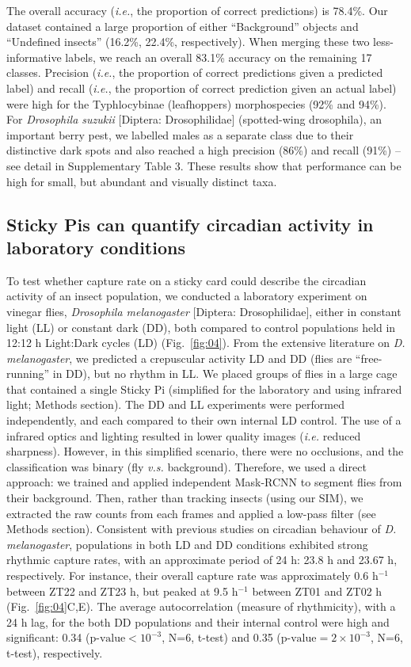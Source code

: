 \documentclass[12pt]{article}
\begin{document}
\begin{linenumbers}
		 The overall accuracy (\emph{i.e.}, the proportion of correct predictions) is 78.4\%. Our dataset contained a large proportion of either “Background” objects and “Undefined insects” (16.2\%, 22.4\%, respectively). When merging these two less-informative labels, we reach an overall 83.1\% accuracy on the remaining 17 classes. Precision (\emph{i.e.}, the proportion of correct predictions given a predicted label) and recall (\emph{i.e.}, the proportion of correct prediction given an actual label) were high for the Typhlocybinae (leafhoppers) morphospecies (92\% and 94\%). For \emph{Drosophila suzukii} [Diptera: Drosophilidae] (spotted-wing drosophila), an important berry pest, we labelled males as a separate class due to their distinctive dark spots and also reached a high precision (86\%) and recall (91\%) -- see detail in Supplementary Table 3. These results show that performance can be high for small, but abundant and visually distinct taxa.

		\subsection*{Sticky Pis can quantify circadian activity in laboratory conditions}
		To test whether capture rate on a sticky card could describe the circadian activity of an insect population, we conducted a laboratory experiment on vinegar flies, \emph{Drosophila melanogaster} [Diptera: Drosophilidae], either in constant light (LL) or constant dark (DD), both compared to control populations held in 12:12 h Light:Dark cycles (LD) (Fig.~\ref{fig:04}). From the extensive literature on \emph{D. melanogaster}, we predicted a crepuscular activity LD and DD (flies are “free-running” in DD), but no rhythm in LL\cite{tataroglu_studying_2014}. We placed groups of flies in a large cage that contained a single Sticky Pi (simplified for the laboratory and using infrared light; Methods section).
		The DD and LL experiments were performed independently, and each compared to their own internal LD control.
        The use of a infrared optics and lighting resulted in lower quality images (\emph{i.e.} reduced sharpness).
        However, in this simplified scenario, there were no occlusions, and the classification was binary (fly \emph{v.s.} background).
        Therefore, we used a direct approach: we trained and applied independent Mask-RCNN to segment flies from their background. 
        Then, rather than tracking insects (using our SIM), we extracted the raw counts from each frames and applied a low-pass filter (see Methods section).
		Consistent with previous studies on circadian behaviour of \emph{D. melanogaster}, populations in both LD and DD conditions exhibited strong rhythmic capture rates, with an approximate period of 24 h: 23.8 h and 23.67 h, respectively. For instance, their overall capture rate was approximately 0.6 h$^{-1}$ between ZT22 and ZT23 h, but peaked at 9.5 h$^{-1}$ between ZT01 and ZT02 h (Fig.~\ref{fig:04}C,E). 
		The average autocorrelation (measure of rhythmicity), with a 24 h lag, for the both DD populations and their internal control were high and significant: 0.34 ($\text{p-value} < 10^{-3}$, N=6, t-test) and 0.35 ($\text{p-value} = 2 \times{} 10^{-3}$, N=6, t-test), respectively. 


\end{linenumbers}
\end{document}
